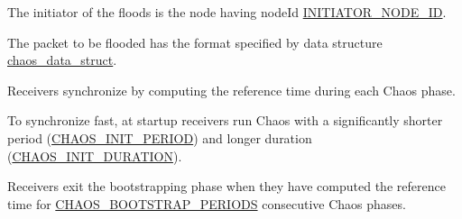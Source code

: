 The initiator of the floods is the node having node\-Id \hyperlink{group__chaos-test-settings_ga2e373237aef3ee2b0fdb15cd0b8c5390}{I\-N\-I\-T\-I\-A\-T\-O\-R\-\_\-\-N\-O\-D\-E\-\_\-\-I\-D}.

The packet to be flooded has the format specified by data structure \hyperlink{structchaos__data__struct}{chaos\-\_\-data\-\_\-struct}.

Receivers synchronize by computing the reference time during each Chaos phase.

To synchronize fast, at startup receivers run Chaos with a significantly shorter period (\hyperlink{group__chaos-test-settings_ga4d273518d37ce068cf9a0a99a80f3d6b}{C\-H\-A\-O\-S\-\_\-\-I\-N\-I\-T\-\_\-\-P\-E\-R\-I\-O\-D}) and longer duration (\hyperlink{group__chaos-test-settings_ga9029d010ebd88a3f038aa1a496da1e0a}{C\-H\-A\-O\-S\-\_\-\-I\-N\-I\-T\-\_\-\-D\-U\-R\-A\-T\-I\-O\-N}).

Receivers exit the bootstrapping phase when they have computed the reference time for \hyperlink{group__chaos-test-settings_ga115f8d5d589cf7d28c1a67902105c766}{C\-H\-A\-O\-S\-\_\-\-B\-O\-O\-T\-S\-T\-R\-A\-P\-\_\-\-P\-E\-R\-I\-O\-D\-S} consecutive Chaos phases. 